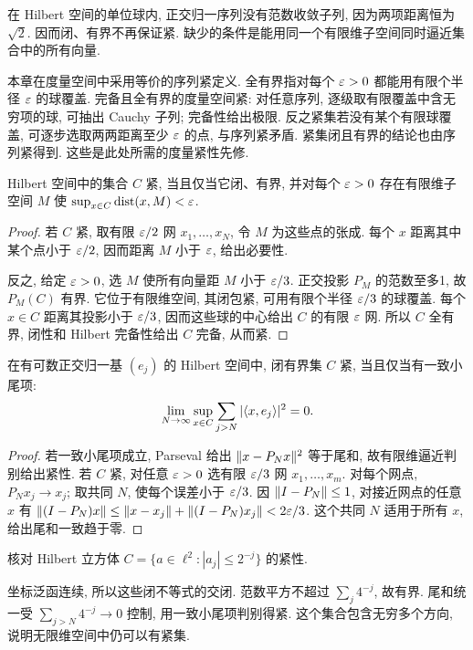 \label{ch:compact}
在 Hilbert 空间的单位球内, 正交归一序列没有范数收敛子列, 因为两项距离恒为 $\sqrt2$. 因而闭、有界不再保证紧. 缺少的条件是能用同一个有限维子空间同时逼近集合中的所有向量.

本章在度量空间中采用等价的序列紧定义. 全有界指对每个 $\varepsilon>0$ 都能用有限个半径 $\varepsilon$ 的球覆盖. 完备且全有界的度量空间紧: 对任意序列, 逐级取有限覆盖中含无穷项的球, 可抽出 Cauchy 子列; 完备性给出极限. 反之紧集若没有某个有限球覆盖, 可逐步选取两两距离至少 $\varepsilon$ 的点, 与序列紧矛盾. 紧集闭且有界的结论也由序列紧得到. 这些是此处所需的度量紧性先修.

\begin{theorem}\label{thm:compact-approx}
Hilbert 空间中的集合 $C$ 紧, 当且仅当它闭、有界, 并对每个 $\varepsilon>0$ 存在有限维子空间 $M$ 使 $\sup_{x\in C}\operatorname{dist}(x,M)<\varepsilon$.
\end{theorem}
\begin{proof}
若 $C$ 紧, 取有限 $\varepsilon/2$ 网 $x_1,\ldots,x_N$, 令 $M$ 为这些点的张成. 每个 $x$ 距离其中某个点小于 $\varepsilon/2$, 因而距离 $M$ 小于 $\varepsilon$, 给出必要性.

反之, 给定 $\varepsilon>0$, 选 $M$ 使所有向量距 $M$ 小于 $\varepsilon/3$. 正交投影 $P_M$ 的范数至多1, 故 $P_M(C)$ 有界. 它位于有限维空间, 其闭包紧, 可用有限个半径 $\varepsilon/3$ 的球覆盖. 每个 $x\in C$ 距离其投影小于 $\varepsilon/3$, 因而这些球的中心给出 $C$ 的有限 $\varepsilon$ 网. 所以 $C$ 全有界, 闭性和 Hilbert 完备性给出 $C$ 完备, 从而紧.
\end{proof}

\begin{corollary}\label{cor:smalltails}
在有可数正交归一基 $(e_j)$ 的 Hilbert 空间中, 闭有界集 $C$ 紧, 当且仅当有一致小尾项:
\[
\lim_{N\to\infty}\sup_{x\in C}\sum_{j>N}|\langle x,e_j\rangle|^2=0.
\]
\end{corollary}
\begin{proof}
若一致小尾项成立, Parseval 给出 $\lVert x-P_Nx\rVert^2$ 等于尾和, 故有限维逼近判别给出紧性. 若 $C$ 紧, 对任意 $\varepsilon>0$ 选有限 $\varepsilon/3$ 网 $x_1,\ldots,x_m$. 对每个网点, $P_Nx_j\to x_j$; 取共同 $N$, 使每个误差小于 $\varepsilon/3$. 因 $\lVert I-P_N\rVert\le1$, 对接近网点的任意 $x$ 有
$\lVert (I-P_N)x\rVert\le\lVert x-x_j\rVert+\lVert (I-P_N)x_j\rVert<2\varepsilon/3$.
这个共同 $N$ 适用于所有 $x$, 给出尾和一致趋于零.
\end{proof}

\begin{example}\label{legacy:ch10:example1}
核对 Hilbert 立方体 $C=\{a\in\ell^2:|a_j|\le2^{-j}\}$ 的紧性.
\end{example}
\begin{solution}
坐标泛函连续, 所以这些闭不等式的交闭. 范数平方不超过 $\sum_j4^{-j}$, 故有界. 尾和统一受 $\sum_{j>N}4^{-j}\to0$ 控制, 用一致小尾项判别得紧. 这个集合包含无穷多个方向, 说明无限维空间中仍可以有紧集.
\end{solution}

